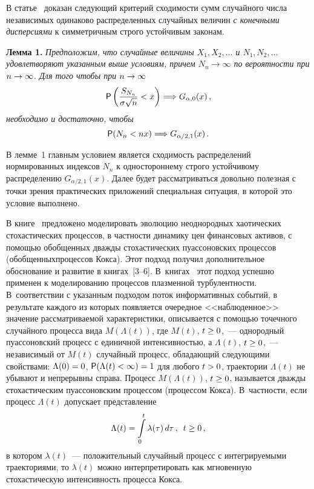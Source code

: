 \begin{multicols}{2}
В статье~\cite{Korolev1997} доказан следующий критерий схо\-димости
сумм случайного числа независимых одинако\-во распределенных случайных
величин \textit{с конечными дисперсиями} к симметричным строго
устойчивым законам.

\smallskip

\noindent
\textbf{Лемма 1.} \textit{Предположим, что случайные величины
$X_1,X_2,\ldots$ и $N_1,N_2,\ldots$ удовлетворяют указанным выше
условиям, причем $N_n\longrightarrow\infty$ по вероятности при
$n\hm\to\infty$. Для того чтобы при} $n\hm\to\infty$
$$
{\sf P}\left(\displaystyle\frac{\displaystyle S_{N_n}\mathstrut}{\displaystyle \sigma\sqrt{n}\mathstrut}<x\right) \Longrightarrow
G_{\alpha,0}(x)\,,
$$
\textit{необходимо и достаточно, чтобы}
$$
{\sf P}(N_n<nx)\Longrightarrow G_{\alpha/2,1}(x)\,.
$$



В лемме~1 главным условием является сходимость распределений
нормированных индексов $N_n$ к одностороннему строго устойчивому
распределению $G_{\alpha/2,1}(x)$. Далее будет рассматриваться
довольно полезная с точки зрения практических приложе\-ний специальная
ситуация, в которой это условие выполнено.

В книге~\cite{GnedenkoKorolev1996} предложено моделировать эволюцию\linebreak
неоднородных хаотических стохастических процессов, в частности
динамику цен финансовых активов, с помощью обобщенных дважды
стохастических пуассоновских процессов (обобщенных\linebreak процессов Кокса).
Этот подход получил дополнительное обоснование и развитие в книгах~[3--6]. 
В~книгах~\cite{Korolev2011, KorolevSkvortsova2006} этот
подход успешно применен к моделированию процессов плазменной
турбулентности. В~соответствии с указанным подходом поток
информативных событий, в результате каждого из которых появляется
очередное <<наблюденное>> значение рассматриваемой характеристики,
описывается с помощью точечного случайного процесса вида
$M(\Lambda(t))$, где $M(t)$, $t\hm\geq0$,~--- однородный пуассоновский
процесс с единичной ин\-тен\-сив\-ностью, а $\Lambda(t)$, $t\hm\geq0$,~---
независимый от $M(t)$ случайный процесс, обладающий следующими
свойствами: $\Lambda(0)\hm=0$, ${\sf P}(\Lambda(t)\hm<\infty)\hm=1$ для
любого $t\hm>0$, траектории $\Lambda(t)$ не убывают и непрерывны
справа. Процесс $M(\Lambda(t))$, $t\hm\geq0$, называется дважды
стохастическим пуассоновским процессом (процессом Кокса). 
В~частности, если процесс $\Lambda(t)$ допускает представление
$$
\Lambda(t)=\int\limits_{0}^{t}\lambda(\tau)\,d\tau\,,\enskip t\ge0\,,
$$
в котором $\lambda(t)$~--- положительный случайный процесс с
интегрируемыми траекториями, то $\lambda(t)$ можно интерпретировать
как мгновенную стохастическую интенсивность процесса Кокса.


\end{multicols}
